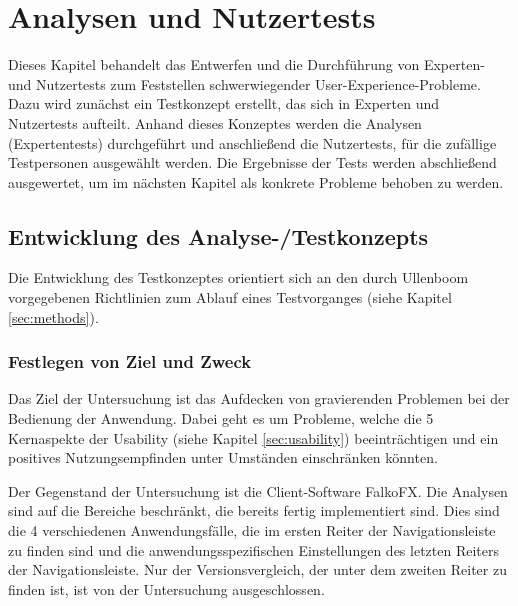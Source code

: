 \chapter{Analysen und Nutzertests} \label{sec:analysisTests}
Dieses Kapitel behandelt das Entwerfen und die Durchführung von Experten- und Nutzertests zum Feststellen schwerwiegender User-Experience-Probleme. Dazu wird zunächst ein Testkonzept erstellt, das sich in Experten und Nutzertests aufteilt. Anhand dieses Konzeptes werden die Analysen (Expertentests) durchgeführt und anschließend die Nutzertests, für die zufällige Testpersonen ausgewählt werden. Die Ergebnisse der Tests werden abschließend ausgewertet, um im nächsten Kapitel als konkrete Probleme behoben zu werden.\par
\section{Entwicklung des Analyse-/Testkonzepts} \label{sec:analysisConcept}
Die Entwicklung des Testkonzeptes orientiert sich an den durch Ullenboom vorgegebenen Richtlinien zum Ablauf eines Testvorganges (siehe Kapitel \ref{sec:methods}).\par
\subsection{Festlegen von Ziel und Zweck}
Das Ziel der Untersuchung ist das Aufdecken von gravierenden Problemen bei der Bedienung der Anwendung. Dabei geht es um Probleme, welche die 5 Kernaspekte der Usability (siehe Kapitel \ref{sec:usability}) beeinträchtigen und ein positives Nutzungsempfinden unter Umständen einschränken könnten.\par
Der Gegenstand der Untersuchung ist die Client-Software FalkoFX. Die Analysen sind auf die Bereiche beschränkt, die bereits fertig implementiert sind. Dies sind die 4 verschiedenen Anwendungsfälle, die im ersten Reiter der Navigationsleiste zu finden sind und die anwendungsspezifischen Einstellungen des letzten Reiters der Navigationsleiste. Nur der Versionsvergleich, der unter dem zweiten Reiter zu finden ist, ist von der Untersuchung ausgeschlossen.\par%
